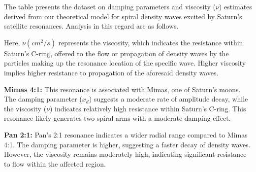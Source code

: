 \documentclass{article}
\begin{document}
\begin{table}
\centering
{}
\caption{Damping parameter and Viscosity estimates from theoretical model for spiral density waves excited by Saturn's Satellite resonances.}
\end{table}

The table presents the dataset on damping parameters and viscosity ($\nu$) estimates derived from our theoretical model for spiral density waves excited by Saturn's satellite resonances. Analysis in this regard are as follows.

Here, $\nu (cm^{2}/s)$ represents the viscosity, which indicates the resistance within Saturn's C-ring, offered to the flow or propagation of density waves by the particles making up the resonance location of the specific wave. Higher viscosity implies higher resistance to propagation of the aforesaid density waves.

\textbf{Mimas 4:1:}
This resonance is associated with Mimas, one of Saturn's moons. The damping parameter ($x_d$) suggests a moderate rate of amplitude decay, while the viscosity ($\nu$) indicates relatively high resistance within Saturn's C-ring. This resonance likely generates two spiral arms with a moderate damping effect.

\textbf{Pan 2:1:}
Pan's 2:1 resonance indicates a wider radial range compared to Mimas 4:1. The damping parameter is higher, suggesting a faster decay of density waves. However, the viscosity remains moderately high, indicating significant resistance to flow within the affected region.
\end{document}
